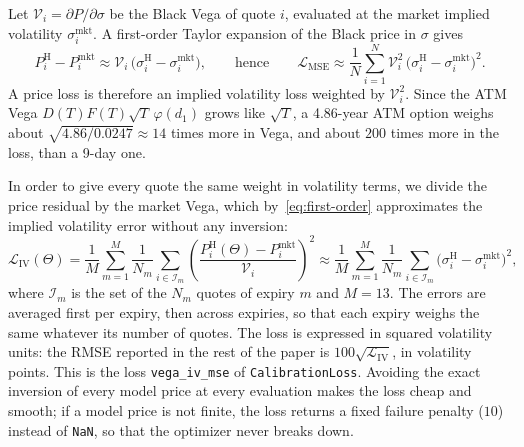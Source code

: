 \documentclass[11pt,a4paper]{article}
\theoremstyle{plain}
\theoremstyle{definition}
\begin{document}
Let $\mathcal V_i=\partial P/\partial\sigma$ be the Black Vega of quote $i$, evaluated at the market implied volatility $\sigma^{\mathrm{mkt}}_i$. A first-order Taylor expansion of the Black price in $\sigma$ gives
\begin{equation}
    P^{\mathrm{H}}_i-P^{\mathrm{mkt}}_i\approx\mathcal V_i\,\bigl(\sigma^{\mathrm{H}}_i-\sigma^{\mathrm{mkt}}_i\bigr),
    \qquad\text{hence}\qquad
    \mathcal L_{\mathrm{MSE}}\approx\frac1N\sum_{i=1}^N\mathcal V_i^2\,\bigl(\sigma^{\mathrm{H}}_i-\sigma^{\mathrm{mkt}}_i\bigr)^2 .
    \label{eq:first-order}
\end{equation}
A price loss is therefore an implied volatility loss weighted by $\mathcal V_i^2$. Since the ATM Vega $D(T)F(T)\sqrt{T}\,\varphi(d_1)$ grows like $\sqrt T$, a 4.86-year ATM option weighs about $\sqrt{4.86/0.0247}\approx14$ times more in Vega, and about $200$ times more in the loss, than a 9-day one.

In order to give every quote the same weight in volatility terms, we divide the price residual by the market Vega, which by~\eqref{eq:first-order} approximates the implied volatility error without any inversion:
\begin{equation}
    \mathcal L_{\mathrm{IV}}(\Theta)=\frac1M\sum_{m=1}^{M}\frac1{N_m}\sum_{i\in\mathcal I_m}\left(\frac{P^{\mathrm{H}}_i(\Theta)-P^{\mathrm{mkt}}_i}{\mathcal V_i}\right)^2\approx\frac1M\sum_{m=1}^{M}\frac1{N_m}\sum_{i\in\mathcal I_m}\bigl(\sigma^{\mathrm{H}}_i-\sigma^{\mathrm{mkt}}_i\bigr)^2,
    \label{eq:loss-iv}
\end{equation}
where $\mathcal I_m$ is the set of the $N_m$ quotes of expiry $m$ and $M=13$. The errors are averaged first per expiry, then across expiries, so that each expiry weighs the same whatever its number of quotes. The loss is expressed in squared volatility units: the RMSE reported in the rest of the paper is $100\sqrt{\mathcal L_{\mathrm{IV}}}$, in volatility points. This is the loss \texttt{vega\_iv\_mse} of \texttt{CalibrationLoss}. Avoiding the exact inversion of every model price at every evaluation makes the loss cheap and smooth; if a model price is not finite, the loss returns a fixed failure penalty ($10$) instead of \texttt{NaN}, so that the optimizer never breaks down.
\end{document}

